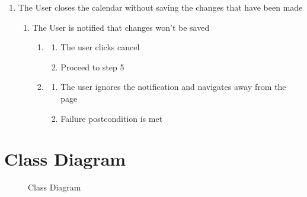 \documentclass[a4paper]{article}
\begin{document}
\begin{enumerate}[label=5\alph*, leftmargin = 3em]
    \item The User closes the calendar without saving the changes that have been made 
    \begin{enumerate}[label=\arabic*.]
        \item The User is notified that changes won’t be saved
        \begin{enumerate}[label=\alph*]
            \item \begin{enumerate}[label=\arabic*.]
                \item The user clicks cancel
                \item Proceed to step 5
            \end{enumerate}
            \item \begin{enumerate}[label=\arabic*.]
                \item The user ignores the notification and navigates away from the page
                \item Failure postcondition is met
            \end{enumerate}
        \end{enumerate}
    \end{enumerate}
\end{enumerate}

\clearpage
\section{Class Diagram}
\begin{figure}[!ht]
    \centering
    \caption{Class Diagram}
    \label{fig:class}
\end{figure}
\end{document}
